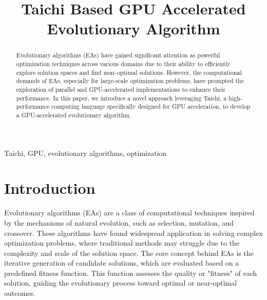 \documentclass[conference]{IEEEtran}
\begin{document}
\title{Taichi Based GPU Accelerated Evolutionary Algorithm}

\author{
    \and
    \and
}

\maketitle

\begin{abstract}
    Evolutionary algorithms (EAs) have gained significant attention as powerful optimization techniques across various domains due to their ability to efficiently explore solution spaces and find near-optimal solutions. However, the computational demands of EAs, especially for large-scale optimization problems, have prompted the exploration of parallel and GPU-accelerated implementations to enhance their performance. In this paper, we introduce a novel approach leveraging Taichi, a high-performance computing language specifically designed for GPU acceleration, to develop a GPU-accelerated evolutionary algorithm.
\end{abstract}

\begin{IEEEkeywords}
    Taichi, GPU, evolutionary algorithms, optimization
\end{IEEEkeywords}

\section{Introduction}
Evolutionary algorithms (EAs) are a class of computational techniques inspired
by the mechanisms of natural evolution, such as selection, mutation, and
crossover. These algorithms have found widespread application in solving
complex optimization problems, where traditional methods may struggle due to
the complexity and scale of the solution space. The core concept behind EAs is
the iterative generation of candidate solutions, which are evaluated based on a
predefined fitness function. This function assesses the quality or "fitness" of
each solution, guiding the evolutionary process toward optimal or near-optimal
outcomes.
\end{document}
